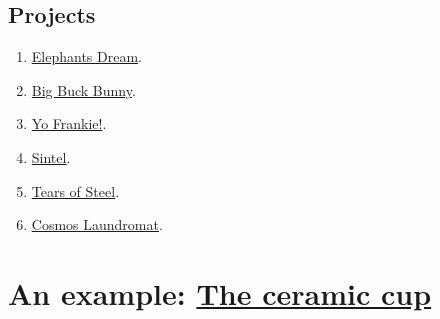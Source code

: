 \section{Projects}
\begin{enumerate}
\item \href{https://orange.blender.org}{Elephants Dream}.
\item \href{https://peach.blender.org}{Big Buck Bunny}.
\item \href{http://www.yofrankie.org}{Yo Frankie!}.
\item \href{https://durian.blender.org}{Sintel}.
\item \href{https://mango.blender.org}{Tears of Steel}.
\item \href{http://gooseberry.blender.org/cosmos-laundromat}{Cosmos Laundromat}.
\end{enumerate}

\chapter{An example:
\href{https://www.youtube.com/watch?v=y__uzGKmxt8}{The ceramic cup}}

